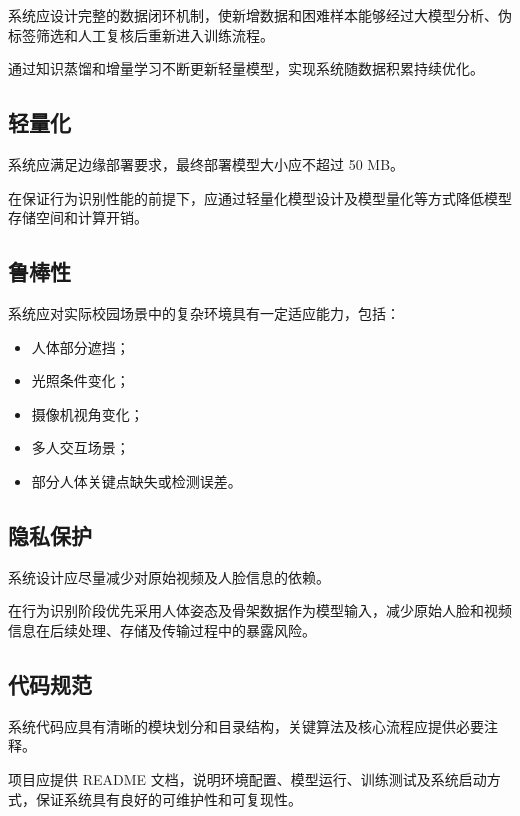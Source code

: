 系统应设计完整的数据闭环机制，使新增数据和困难样本能够经过大模型分析、伪标签筛选和人工复核后重新进入训练流程。

通过知识蒸馏和增量学习不断更新轻量模型，实现系统随数据积累持续优化。

\subsection{轻量化}

系统应满足边缘部署要求，最终部署模型大小应不超过 50 MB。

在保证行为识别性能的前提下，应通过轻量化模型设计及模型量化等方式降低模型存储空间和计算开销。

\subsection{鲁棒性}

系统应对实际校园场景中的复杂环境具有一定适应能力，包括：

\begin{itemize}
\item 人体部分遮挡；
\item 光照条件变化；
\item 摄像机视角变化；
\item 多人交互场景；
\item 部分人体关键点缺失或检测误差。
\end{itemize}

\subsection{隐私保护}

系统设计应尽量减少对原始视频及人脸信息的依赖。

在行为识别阶段优先采用人体姿态及骨架数据作为模型输入，减少原始人脸和视频信息在后续处理、存储及传输过程中的暴露风险。

\subsection{代码规范}

系统代码应具有清晰的模块划分和目录结构，关键算法及核心流程应提供必要注释。

项目应提供 README 文档，说明环境配置、模型运行、训练测试及系统启动方式，保证系统具有良好的可维护性和可复现性。

